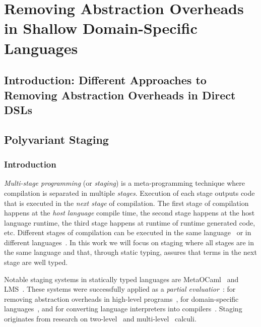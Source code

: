 \part{Removing Abstraction Overheads in Shallow Domain-Specific Languages}

\chapter{Introduction: Different Approaches to Removing Abstraction Overheads in Direct DSLs}
\label{sec:introdution-partial-evaluation}

\chapter{Polyvariant Staging}

 \section{Introduction}

 \emph{Multi-stage programming} (or \emph{staging}) is a meta-programming technique
  where compilation is separated in multiple \emph{stages}. Execution of each
  stage outputs code that is executed in the \emph{next stage} of compilation. The first
  stage of compilation happens at the \emph{host language} compile time, the second
  stage happens at the host language runtime, the third stage happens at runtime of
  runtime generated code, etc. Different stages of compilation can be executed in the same
  language~\cite{taha_multi-stage_1997,nielson2005two} or in different languages~\cite{brown_heterogeneous_2011,devito2013terra}.
  In this work we will focus on staging where all stages are in the same language and that, through static typing, assures that terms in the next stage are well typed.

  Notable staging systems in statically typed languages are
  MetaOCaml~\cite{taha_multi-stage_1997,calcagno2003implementing}
  and LMS~\cite{rompf2012lightweight}. These systems were successfully applied as a
  \emph{partial evaluatior}~\cite{jones1993partial}: for removing abstraction
  overheads in high-level programs~\cite{carette2005multi,rompf2012lightweight},
  for domain-specific languages~\cite{czarnecki_dsl_2004,jonnalagedda2014staged,taha2004gentle}, and for converting language
  interpreters into compilers~\cite{lancet,futamura1999partial}. Staging originates
  from research on two-level~\cite{nielson2005two,davies1996temporal} and multi-level~\cite{davies1996modal} calculi.


